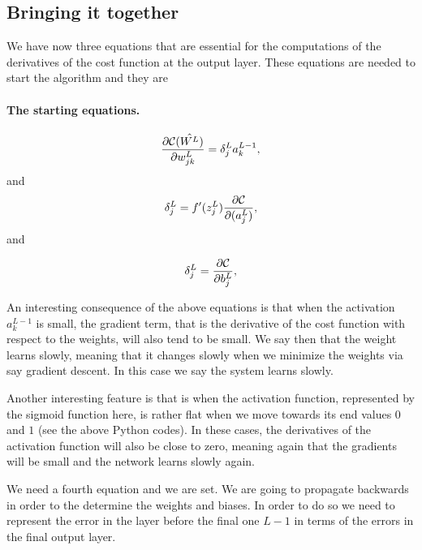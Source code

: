\documentclass[%
oneside,                 %
final,                   %
10pt]{article}
\begin{document}
\subsection{Bringing it together}

We have now three equations that are essential for the computations of the derivatives of the cost function at the output layer. These equations are needed to start the algorithm and they are


\paragraph{The starting equations.}

\begin{equation}
\frac{\partial{\cal C}(\hat{W^L})}{\partial w_{jk}^L}  =  \delta_j^La_k^{L-1},
\end{equation}
and
\begin{equation}
\delta_j^L = f'(z_j^L)\frac{\partial {\cal C}}{\partial (a_j^L)},
\end{equation}
and

\begin{equation}
\delta_j^L = \frac{\partial {\cal C}}{\partial b_j^L},
\end{equation}



An interesting consequence of the above equations is that when the
activation $a_k^{L-1}$ is small, the gradient term, that is the
derivative of the cost function with respect to the weights, will also
tend to be small. We say then that the weight learns slowly, meaning
that it changes slowly when we minimize the weights via say gradient
descent. In this case we say the system learns slowly.

Another interesting feature is that is when the activation function,
represented by the sigmoid function here, is rather flat when we move towards
its end values $0$ and $1$ (see the above Python codes). In these
cases, the derivatives of the activation function will also be close
to zero, meaning again that the gradients will be small and the
network learns slowly again.

We need a fourth equation and we are set. We are going to propagate
backwards in order to the determine the weights and biases. In order
to do so we need to represent the error in the layer before the final
one $L-1$ in terms of the errors in the final output layer.

\end{document}
